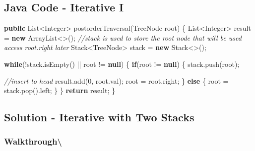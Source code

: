 \documentclass[]{book}
\newenvironment{Shaded}{\begin{snugshade}}{\end{snugshade}}
\newcommand{\BuiltInTok}[1]{#1}
\newcommand{\CommentTok}[1]{\textcolor[rgb]{0.56,0.35,0.01}{\textit{#1}}}
\newcommand{\DecValTok}[1]{\textcolor[rgb]{0.00,0.00,0.81}{#1}}
\newcommand{\FunctionTok}[1]{\textcolor[rgb]{0.00,0.00,0.00}{#1}}
\newcommand{\KeywordTok}[1]{\textcolor[rgb]{0.13,0.29,0.53}{\textbf{#1}}}
\newcommand{\NormalTok}[1]{#1}
\begin{document}
\hypertarget{java-code---iterative-i-2}{%
\subsection{Java Code - Iterative I}\label{java-code---iterative-i-2}}

\begin{Shaded}
\begin{Highlighting}[]
\KeywordTok{public} \BuiltInTok{List}\NormalTok{<}\BuiltInTok{Integer}\NormalTok{> }\FunctionTok{postorderTraversal}\NormalTok{(}\BuiltInTok{TreeNode}\NormalTok{ root) \{}
    \BuiltInTok{List}\NormalTok{<}\BuiltInTok{Integer}\NormalTok{> result = }\KeywordTok{new} \BuiltInTok{ArrayList}\NormalTok{<>();}
    \CommentTok{//stack is used to store the root node that will be used access root.right later}
    \BuiltInTok{Stack}\NormalTok{<}\BuiltInTok{TreeNode}\NormalTok{> stack = }\KeywordTok{new} \BuiltInTok{Stack}\NormalTok{<>();}

    \KeywordTok{while}\NormalTok{(!stack.}\FunctionTok{isEmpty}\NormalTok{() || root != }\KeywordTok{null}\NormalTok{) \{}
        \KeywordTok{if}\NormalTok{(root != }\KeywordTok{null}\NormalTok{) \{}
\NormalTok{            stack.}\FunctionTok{push}\NormalTok{(root);}

            \CommentTok{//insert to head}
\NormalTok{            result.}\FunctionTok{add}\NormalTok{(}\DecValTok{0}\NormalTok{, root.}\FunctionTok{val}\NormalTok{);}
\NormalTok{            root = root.}\FunctionTok{right}\NormalTok{;}
\NormalTok{        \} }\KeywordTok{else}\NormalTok{ \{}
\NormalTok{            root = stack.}\FunctionTok{pop}\NormalTok{().}\FunctionTok{left}\NormalTok{;}
\NormalTok{        \}}
\NormalTok{    \}}
    \KeywordTok{return}\NormalTok{ result;}
\NormalTok{\}}
\end{Highlighting}
\end{Shaded}

\hypertarget{solution---iterative-with-two-stacks}{%
\subsection{Solution - Iterative with Two Stacks}\label{solution---iterative-with-two-stacks}}

\hypertarget{walkthrough-72}{%
\subsubsection{Walkthrough\textbackslash{}}\label{walkthrough-72}}
\end{document}
